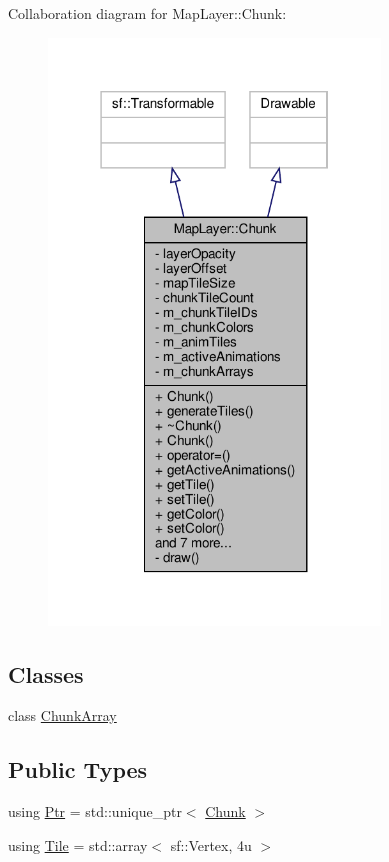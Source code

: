 Collaboration diagram for Map\+Layer\+:\+:Chunk\+:
\nopagebreak
\begin{figure}[H]
\begin{center}
\leavevmode
\includegraphics[width=250pt]{classMapLayer_1_1Chunk__coll__graph}
\end{center}
\end{figure}
\subsection*{Classes}
\begin{DoxyCompactItemize}
\item 
class \hyperlink{classMapLayer_1_1Chunk_1_1ChunkArray}{Chunk\+Array}
\end{DoxyCompactItemize}
\subsection*{Public Types}
\begin{DoxyCompactItemize}
\item 
using \hyperlink{classMapLayer_1_1Chunk_ab1df4d3621c5d9f83c2edb46d0744078}{Ptr} = std\+::unique\+\_\+ptr$<$ \hyperlink{classMapLayer_1_1Chunk}{Chunk} $>$
\item 
using \hyperlink{classMapLayer_1_1Chunk_a2137a288bfd4120eb3e4db5934b802f3}{Tile} = std\+::array$<$ sf\+::\+Vertex, 4u $>$
\end{DoxyCompactItemize}
